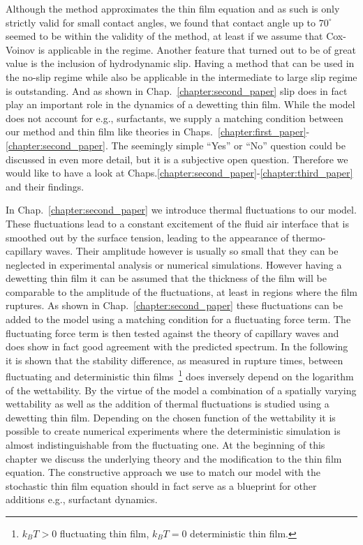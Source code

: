 Although the method approximates the thin film equation and as such is only strictly valid for small contact angles, we found that contact angle up to $70^{\circ}$ seemed to be within the validity of the method, at least if we assume that Cox-Voinov is applicable in the regime.
Another feature that turned out to be of great value is the inclusion of hydrodynamic slip.
Having a method that can be used in the no-slip regime while also be applicable in the intermediate to large slip regime is outstanding.
And as shown in Chap.~\ref{chapter:second_paper} slip does in fact play an important role in the dynamics of a dewetting thin film.
While the model does not account for e.g., surfactants, we supply a matching condition between our method and thin film like theories in Chaps.~\ref{chapter:first_paper}-\ref{chapter:second_paper}.
The seemingly simple ``Yes'' or ``No'' question could be discussed in even more detail, but it is a subjective open question.
Therefore we would like to have a look at Chaps.\ref{chapter:second_paper}-\ref{chapter:third_paper} and their findings.
 
In Chap.~\ref{chapter:second_paper} we introduce thermal fluctuations to our model.
These fluctuations lead to a constant excitement of the fluid air interface that is smoothed out by the surface tension, leading to the appearance of thermo-capillary waves.
Their amplitude however is usually so small that they can be neglected in experimental analysis or numerical simulations. 
However having a dewetting thin film it can be assumed that the thickness of the film will be comparable to the amplitude of the fluctuations, at least in regions where the film ruptures.
As shown in Chap.~\ref{chapter:second_paper} these fluctuations can be added to the model using a matching condition for a fluctuating force term. 
The fluctuating force term is then tested against the theory of capillary waves and does show in fact good agreement with the predicted spectrum.
In the following it is shown that the stability difference, as measured in rupture times, between fluctuating and deterministic thin films~\footnote{$k_BT > 0$ fluctuating thin film, $k_BT = 0$ deterministic thin film.} does inversely depend on the logarithm of the wettability. 
By the virtue of the model a combination of a spatially varying wettability as well as the addition of thermal fluctuations is studied using a dewetting thin film.
Depending on the chosen function of the wettability it is possible to create numerical experiments where the deterministic simulation is almost indistinguishable from the fluctuating one.
At the beginning of this chapter we discuss the underlying theory and the modification to the thin film equation.
The constructive approach we use to match our model with the stochastic thin film equation should in fact serve as a blueprint for other additions e.g., surfactant dynamics. 

